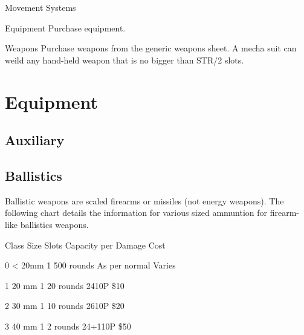 \documentclass[twoside]{book}
\begin{document}
                    
                  Movement Systems  
                  
                
                
                Equipment  
                  Purchase equipment.   
                
                
                Weapons  
                    Purchase weapons from the generic weapons
                   sheet. 
                   A mecha suit can weild any hand-held weapon that
                   is no bigger than STR/2 slots. 
                
            
\section{Equipment}
    
\subsection{Auxiliary}
    
\subsection{Ballistics}
      Ballistic weapons are scaled firearms or missiles
               (not energy weapons). The following chart details the
               information for various sized ammuntion for firearm-like
               ballistics weapons.   
                
                  
                   Class   
                   Size   
                   Slots   
                   Capacity per   
                   Damage   
                   Cost   
                  
                  
                   0   
                   < 20mm   
                   1   
                   500 rounds   
                   As per normal   
                   Varies   
                  
                  
                   1   
                   20 mm   
                   1   
                   20 rounds   
                   2410P   
                   \$10   
                  
                  
                   2   
                   30 mm   
                   1   
                   10 rounds   
                   2610P   
                   \$20   
                  
                  
                   3   
                   40 mm   
                   1   
                   2 rounds   
                   24+110P   
                   \$50   
                  
\end{document}
